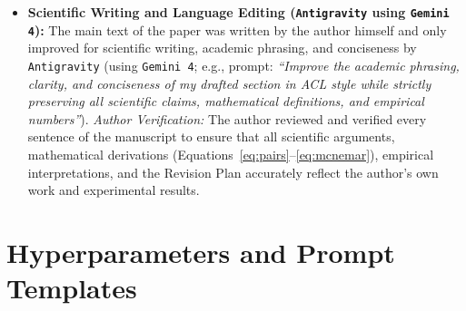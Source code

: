 \begin{itemize}
    \item \textbf{Scientific Writing and Language Editing (\texttt{Antigravity} using \texttt{Gemini 4}):} The main text of the paper was written by the author himself and only improved for scientific writing, academic phrasing, and conciseness by \texttt{Antigravity} (using \texttt{Gemini 4}; e.g., prompt: \emph{``Improve the academic phrasing, clarity, and conciseness of my drafted section in ACL style while strictly preserving all scientific claims, mathematical definitions, and empirical numbers''}). \emph{Author Verification:} The author reviewed and verified every sentence of the manuscript to ensure that all scientific arguments, mathematical derivations (Equations~\ref{eq:pairs}--\ref{eq:mcnemar}), empirical interpretations, and the Revision Plan accurately reflect the author's own work and experimental results.
\end{itemize}

\section{Hyperparameters and Prompt Templates}
\label{sec:appendix_hyperparams}

\begin{table}[t]
\centering
\scriptsize
\renewcommand{\arraystretch}{0.94}
\caption{Summary of experimental hyperparameters and evaluation settings.}
\label{tab:hyperparams}
\end{table}

